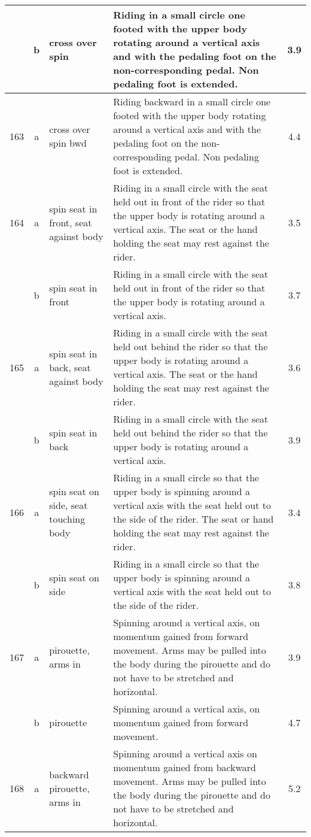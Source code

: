\begin{longtable}{|r|c|p{4cm}|p{8cm}|c|}
\hline
  & b & cross over spin & Riding in a small circle one footed with the upper body rotating around a vertical axis and with the pedaling foot on the non-corresponding pedal. Non pedaling foot is extended. & 3.9 \\ 
\hline
163 & a & cross over spin bwd & Riding backward in a small circle one footed with the upper body rotating around a vertical axis and with the pedaling foot on the non-corresponding pedal. Non pedaling foot is extended.  & 4.4 \\ 
\hline
164 & a & spin seat in front, seat against body & Riding in a small circle with the seat held out in front of the rider so that the upper body is rotating around a vertical axis. The seat or the hand holding the seat may rest against the rider.  & 3.5 \\ 
\hline
  & b & spin seat in front  & Riding in a small circle with the seat held out in front of the rider so that the upper body is rotating around a vertical axis.  & 3.7 \\ 
\hline
165 & a & spin seat in back, seat against body  & Riding in a small circle with the seat held out behind the rider so that the upper body is rotating around a vertical axis. The seat or the hand holding the seat may rest against the rider. & 3.6 \\ 
\hline
  & b & spin seat in back & Riding in a small circle with the seat held out behind the rider so that the upper body is rotating around a vertical axis. & 3.9 \\ 
\hline
166 & a & spin seat on side, seat touching body & Riding in a small circle so that the upper body is spinning around a vertical axis with the seat held out to the side of the rider. The seat or hand holding the seat may rest against the rider. & 3.4 \\ 
\hline
  & b & spin seat on side & Riding in a small circle so that the upper body is spinning around a vertical axis with the seat held out to the side of the rider. & 3.8 \\ 
\hline
167 & a & pirouette, arms in  & Spinning around a vertical axis, on momentum gained from forward movement. Arms may be pulled into the body during the pirouette and do not have to be stretched and horizontal.  & 3.9 \\ 
\hline
  & b & pirouette & Spinning around a vertical axis, on momentum gained from forward movement.  & 4.7 \\ 
\hline
168 & a & backward pirouette, arms in & Spinning around a vertical axis on momentum gained from backward movement. Arms may be pulled into the body during the pirouette and do not have to be stretched and horizontal.  & 5.2 \\ 

\end{longtable}
